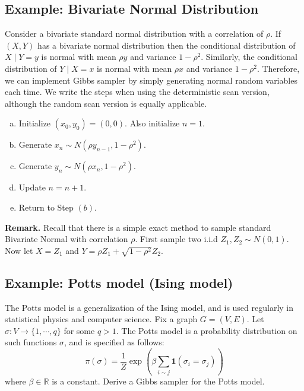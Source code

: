 \documentclass[11pt]{elegantbook}
\begin{document}
\subsection{Example: Bivariate Normal Distribution}
Consider a bivariate standard normal distribution with a correlation of $\rho$. If $(X, Y)$ has a bivariate normal distribution then the conditional distribution of $X \mid Y=y$ is normal with mean $\rho y$ and variance $1-\rho^2$. Similarly, the conditional distribution of $Y \mid X=x$ is normal with mean $\rho x$ and variance $1-\rho^2$. Therefore, we can implement Gibbs sampler by simply generating normal random variables each time. We write the steps when using the deterministic scan version, although the random scan version is equally applicable.
\begin{enumerate}[(a)]
    \item Initialize $\left(x_0, y_0\right)=(0,0)$. Also initialize $n=1$.
    \item Generate $x_n \sim N\left(\rho y_{n-1}, 1-\rho^2\right)$.
    \item Generate $y_n \sim N\left(\rho x_n, 1-\rho^2\right)$.
    \item Update $n=n+1$.
    \item Return to Step $(b)$.
\end{enumerate}
\textbf{Remark.} Recall that there is a simple exact method to sample standard Bivariate Normal with correlation $\rho$. First sample two i.i.d $Z_1, Z_2 \sim N(0,1)$. Now let $X=Z_1$ and $Y=\rho Z_1+\sqrt{1-\rho^2} Z_2$.

\subsection{Example: Potts model (Ising model)}
The Potts model is a generalization of the Ising model, and is used regularly in statistical physics and computer science. Fix a graph $G=(V, E)$. Let $\sigma: V \rightarrow\{1, \cdots, q\}$ for some $q>1$. The Potts model is a probability distribution on such functions $\sigma$, and is specified as follows:
$$
\pi(\sigma)=\frac{1}{Z} \exp \left(\beta \sum_{i \sim j} \mathbf{1}\left(\sigma_i=\sigma_j\right)\right)
$$
where $\beta \in \mathbb{R}$ is a constant. Derive a Gibbs sampler for the Potts model.
\end{document}
